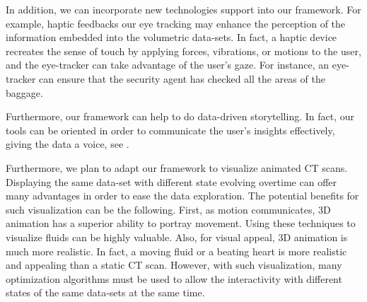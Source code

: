 In addition,  we can incorporate new technologies support into our framework. For example, haptic feedbacks our eye tracking may enhance the perception of the information embedded into the volumetric data-sets. In fact, a haptic device recreates the sense of touch by applying forces, vibrations, or motions to the user, and the eye-tracker can take advantage of the user's gaze. For instance, an eye-tracker can ensure that the security agent has checked all the areas of the baggage. 


Furthermore, our framework can help to do data-driven storytelling. In fact, our tools can be oriented in order to communicate the user's insights effectively, giving the data a voice, see \cite{storytelling}.

Furthermore, we plan to adapt our framework to visualize animated CT scans. Displaying the same data-set with different state evolving overtime can offer many advantages in order to ease the data exploration. The potential benefits for such visualization can be the following. First, as motion communicates, 3D animation has a superior ability to portray movement. Using these techniques to visualize fluids can be highly valuable. Also, for visual appeal, 3D animation is much more realistic. In fact, a moving fluid or a beating heart is more realistic and appealing than a static CT scan. However, with such visualization, many optimization algorithms must be used to
     allow the interactivity with different states of the same data-sets at the same time.
     